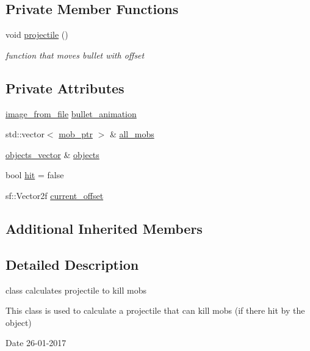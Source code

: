 \subsection*{Private Member Functions}
\begin{DoxyCompactItemize}
\item 
void \hyperlink{classbullet_a1f2cd5b7fa4d4beae1d27c06bc54f8c0}{projectile} ()
\begin{DoxyCompactList}\small\item\em function that moves bullet with offset \end{DoxyCompactList}\end{DoxyCompactItemize}
\subsection*{Private Attributes}
\begin{DoxyCompactItemize}
\item 
\hyperlink{classimage__from__file}{image\+\_\+from\+\_\+file} \hyperlink{classbullet_a112af2b0e62f62dbe4d31fdd726c760b}{bullet\+\_\+animation}
\item 
std\+::vector$<$ \hyperlink{npc_8hpp_a09ee7f853fc9bc830a9445a06fd53d4b}{mob\+\_\+ptr} $>$ \& \hyperlink{classbullet_a8730572b757fc9d664fb3ce640a797ce}{all\+\_\+mobs}
\item 
\hyperlink{drawable_8hpp_a6c0fdb1dfd0c34dbbdbb5dcd3c608b07}{objects\+\_\+vector} \& \hyperlink{classbullet_a93b79bed80ce59b86e3fd332d0c03c5c}{objects}
\item 
bool \hyperlink{classbullet_aa8ad03cdacad1e53dedf55b0719b8980}{hit} = false
\item 
sf\+::\+Vector2f \hyperlink{classbullet_af59d163e270aa74ebc5fafe6146400bc}{current\+\_\+offset}
\end{DoxyCompactItemize}
\subsection*{Additional Inherited Members}


\subsection{Detailed Description}
class calculates projectile to kill mobs 

This class is used to calculate a projectile that can kill mobs (if there hit by the object)

\begin{DoxyDate}{Date}
26-\/01-\/2017 
\end{DoxyDate}


